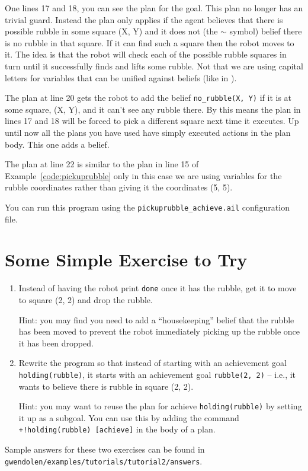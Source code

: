 One lines 17 and 18, you can see the plan for the goal.  This plan no longer has an trivial guard.  Instead the plan only applies if the agent believes that there is possible rubble in some square (X, Y) and it does not (the $\sim$ symbol) belief there is no rubble in that square.  If it can find such a square then the robot moves to it.  The idea is that the robot will check each of the possible rubble squares  in turn until it successfully finds and lifts some rubble.  Not that we are using capital letters for variables that can be unified against beliefs (like in \prolog).

The plan at line 20 gets the robot to add the belief \lstinline{no_rubble(X, Y)} if it is at some square, (X, Y), and it can't see any rubble there.  By this means the plan in lines 17 and 18 will be forced to pick a different square next time it executes.  Up until now all the plans you have used have simply executed actions in the plan body.  This one adds a belief.

The plan at line 22 is similar to the plan in line 15 of Example~\ref{code:pickuprubble} only in this case we are using variables for the rubble coordinates rather than giving it the coordinates (5, 5).

You can run this program using the \lstinline{pickuprubble_achieve.ail} configuration file.

\section{Some Simple Exercise to Try}
\begin{enumerate}
\item Instead of having the robot print \lstinline{done} once it has the rubble, get it to move to square (2, 2) and drop the rubble.  

Hint: you may find  you need to add a ``housekeeping'' belief that the rubble has been moved to prevent the robot immediately picking up the rubble once it has been dropped.
\item Rewrite the program so that instead of starting with an achievement goal \lstinline{holding(rubble)}, it starts with an achievement goal \lstinline{rubble(2, 2)} -- i.e., it wants to believe there is rubble in square (2, 2).

Hint: you may want to reuse the plan for achieve \lstinline{holding(rubble)} by setting it up as a subgoal.  You can use this by adding the command \lstinline{+!holding(rubble) [achieve]} in the body of a plan.
\end{enumerate}
\begin{sloppypar}
Sample answers for these two exercises can be found in \texttt{gwendolen/examples/tutorials/tutorial2/answers}.
\end{sloppypar}


